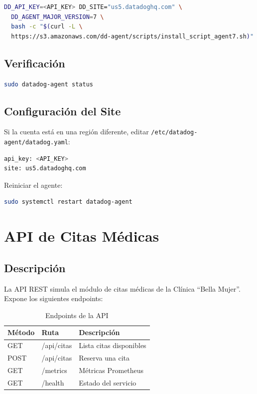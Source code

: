 \documentclass[12pt, a4paper]{article}
\begin{document}
\begin{lstlisting}[language=bash, caption={Instalación de Datadog Agent v7}]
DD_API_KEY=<API_KEY> DD_SITE="us5.datadoghq.com" \
  DD_AGENT_MAJOR_VERSION=7 \
  bash -c "$(curl -L \
  https://s3.amazonaws.com/dd-agent/scripts/install_script_agent7.sh)"
\end{lstlisting}

\subsection{Verificación}

\begin{lstlisting}[language=bash, caption={Verificación del agente}]
sudo datadog-agent status
\end{lstlisting}

\subsection{Configuración del Site}

Si la cuenta está en una región diferente, editar \texttt{/etc/datadog-agent/datadog.yaml}:

\begin{lstlisting}[language=bash, caption={Configuración de Datadog}]
api_key: <API_KEY>
site: us5.datadoghq.com
\end{lstlisting}

Reiniciar el agente:

\begin{lstlisting}[language=bash]
sudo systemctl restart datadog-agent
\end{lstlisting}

\newpage

\section{API de Citas Médicas}

\subsection{Descripción}

La API REST simula el módulo de citas médicas de la Clínica ``Bella Mujer''. Expone los siguientes endpoints:

\begin{table}[H]
\centering
\caption{Endpoints de la API}
\label{tab:endpoints}
\begin{tabular}{lll}
\toprule
\textbf{Método} & \textbf{Ruta} & \textbf{Descripción} \\
\midrule
GET & /api/citas & Lista citas disponibles \\
POST & /api/citas & Reserva una cita \\
GET & /metrics & Métricas Prometheus \\
GET & /health & Estado del servicio \\
\bottomrule
\end{tabular}
\end{table}
\end{document}
